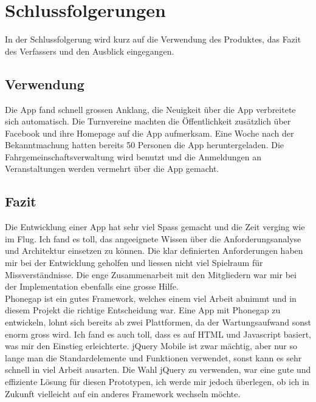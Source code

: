 %
%

\chapter{Schlussfolgerungen}\label{chap.Schlussfolgerungen}
In der Schlussfolgerung wird kurz auf die Verwendung des Produktes, das Fazit des Verfassers und den Ausblick eingegangen.

\section{Verwendung}\label{fazit_verwendung}
Die App fand schnell grossen Anklang, die Neuigkeit über die App verbreitete sich automatisch. Die Turnvereine machten die Öffentlichkeit zusätzlich über Facebook und ihre Homepage auf die App aufmerksam. Eine Woche nach der Bekanntmachung hatten bereits 50 Personen die App heruntergeladen. Die Fahrgemeinschaftsverwaltung wird benutzt und die Anmeldungen an Veranstaltungen werden vermehrt über die App gemacht.

\section{Fazit}\label{fazit}

Die Entwicklung einer App hat sehr viel Spass gemacht und die Zeit verging wie im Flug. Ich fand es toll, das angeeignete Wissen über die Anforderungsanalyse und Architektur einsetzen zu können. Die klar definierten Anforderungen haben mir bei der Entwicklung geholfen und liessen nicht viel Spielraum für Missverständnisse. Die enge Zusammenarbeit mit den Mitgliedern war mir bei der Implementation ebenfalls eine grosse Hilfe.\\

Phonegap ist ein gutes Framework, welches einem viel Arbeit abnimmt und in diesem Projekt die richtige Entscheidung war. Eine App mit Phonegap zu entwickeln, lohnt sich bereits ab zwei Plattformen, da der Wartungsaufwand sonst enorm gross wird. Ich fand es auch toll, dass es auf HTML und Javascript basiert, was mir den Einstieg erleichterte. jQuery Mobile ist zwar mächtig, aber nur so lange man die Standardelemente und Funktionen verwendet, sonst kann es sehr schnell in viel Arbeit ausarten. Die Wahl jQuery zu verwenden, war eine gute und effiziente Lösung für diesen Prototypen, ich werde mir jedoch überlegen, ob ich in Zukunft vielleicht auf ein anderes Framework wechseln möchte.\\

